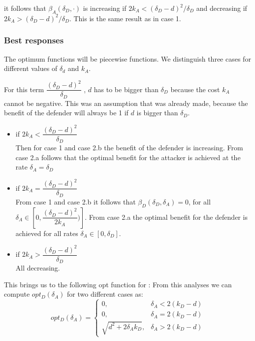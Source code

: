 it follows that $\beta_{A}(\delta_{D},\cdot)$ is increasing if $2k_{A} < (\delta_{D} - d)^{2} / \delta_{D}$ and decreasing if $2k_{A} > (\delta_{D} - d)^{2} / \delta_{D}$. This is the same result as in case 1.\\


\subsubsection{Best responses}
The optimum functions will be piecewise functions. We distinguish three cases for different values of $\delta_{d}$ and $k_{A}$. 


For this term $\dfrac{(\delta_{D}-d)^{2}}{\delta_{D}} $ , $d$ has to be bigger than  $\delta_{D}$ because the cost $k_{A}$ cannot be negative. This was an assumption that was already made, because the benefit of the defender will always be 1 if $d$ is bigger than  $\delta_{D}$.
\begin{itemize}
\item if $2k_{A} < \dfrac{(\delta_{D}-d)^{2}}{\delta_{D}} $ \\
Then for case 1 and case 2.b the benefit of the defender is increasing. From case 2.a follows that the optimal benefit for the attacker is achieved at the rate $\delta_{A} = \delta_{D}$
\item if $2k_{A} = \dfrac{(\delta_{D}-d)^{2}}{\delta_{D}} $ \\
From case 1 and case 2.b it follows that $\beta_{D}(\delta_{D},\delta_{A})=0$, for all $\delta_{A} \in [0,\dfrac{(\delta_{D}-d)^{2}}{2k_{A}})]$. From case 2.a the optimal benefit for the defender is achieved for all rates $\delta_{A} \in [0, \delta_{D}]$.
\item if $2k_{A} > \dfrac{(\delta_{D}-d)^{2}}{\delta_{D}} $ \\
All decreasing.
\end{itemize}

This brings us to the following opt function for : 
From this analyses we can compute $opt_{D}(\delta_{A})$ for two different cases as:
 \begin{displaymath}
  opt_{D}(\delta_{A}) = \left\{
     \begin{array}{lr}
       0, & \delta_{A} < 2(k_{D} - d)\\
       0, & \delta_{A} = 2(k_{D} - d) \\
       \sqrt{d^{2} + 2\delta_{A}k_{D}}, & \delta_{A} > 2(k_{D} - d)
     \end{array}
   \right.
\end{displaymath}


